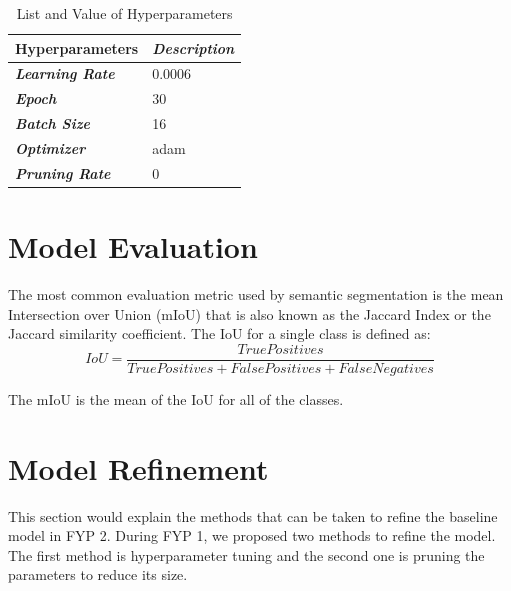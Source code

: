 \begin{table}[!h]
\centering
\begin{tabular}{|l|l|}
\hline
\multicolumn{1}{|c|}{\textbf{Hyperparameters}} & \multicolumn{1}{c|}{\textit{\textbf{Description}}} \\ \hline
\textit{\textbf{Learning Rate}}                &   0.0006                                                 \\ \hline
\textit{\textbf{Epoch}}                        &          30                                          \\ \hline
\textit{\textbf{Batch Size}}                   &     16                                               \\ \hline
\textit{\textbf{Optimizer}}                    &         adam                                           \\ \hline
\textit{\textbf{Pruning Rate}}                    &         0                                          \\ \hline

\end{tabular}
\caption{List and Value of Hyperparameters}
\label{tab:hyperparam-value}

\end{table}

\section{Model Evaluation}

The most common evaluation metric used by semantic segmentation is the mean Intersection over Union (mIoU) that is also known as the Jaccard Index or the Jaccard similarity coefficient. The IoU for a single class is defined as:
\begin{equation}
    IoU = \frac{True Positives}{True Positives + False Positives + False Negatives}
\end{equation}

The mIoU is the mean of the IoU for all of the classes.

\section{Model Refinement}

This section would explain the methods that can be taken to refine the baseline model in FYP 2. During FYP 1, we proposed two methods to refine the model. The first method is hyperparameter tuning and the second one is pruning the parameters to reduce its size. 


